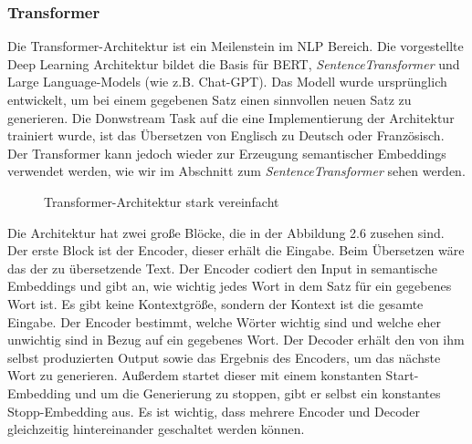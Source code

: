 \documentclass[12pt,letterpaper,ngerman]{article}
\begin{document}
\subsubsection{Transformer}
Die Transformer-Architektur \cite{transformer}
ist ein Meilenstein im NLP Bereich.
Die vorgestellte Deep Learning Architektur bildet die Basis für BERT,
\textit{SentenceTransformer} und Large Language-Models (wie z.B. Chat-GPT).
Das Modell wurde ursprünglich entwickelt, um bei einem gegebenen Satz 
einen sinnvollen neuen Satz zu generieren. Die Donwstream Task auf die 
eine Implementierung der Architektur trainiert wurde,
ist das Übersetzen von Englisch zu Deutsch oder Französisch. 
Der Transformer kann jedoch wieder zur Erzeugung semantischer Embeddings 
verwendet werden, wie wir im Abschnitt zum \textit{SentenceTransformer} sehen 
werden.
\begin{figure}[H]
  \begin{center}
  \end{center}
  \caption{Transformer-Architektur stark vereinfacht}
\end{figure}
Die Architektur hat zwei große Blöcke, die in der Abbildung 2.6 zusehen
sind. Der erste Block ist der Encoder, dieser erhält die Eingabe.
Beim Übersetzen wäre das der zu übersetzende Text.
Der Encoder codiert den Input in semantische Embeddings und gibt an,
wie wichtig jedes Wort in dem Satz für ein gegebenes Wort ist.
Es gibt keine Kontextgröße, sondern der Kontext ist die gesamte
Eingabe.
Der Encoder bestimmt, welche Wörter wichtig sind und welche eher 
unwichtig sind in Bezug auf ein gegebenes Wort.
Der Decoder erhält den von ihm selbst produzierten Output sowie 
das Ergebnis des Encoders, um das nächste Wort zu generieren. 
Außerdem startet dieser mit einem konstanten Start-Embedding und 
um die Generierung zu stoppen, gibt er selbst ein konstantes 
Stopp-Embedding aus. Es ist wichtig, dass mehrere Encoder und Decoder 
gleichzeitig hintereinander geschaltet werden können.
\end{document}
